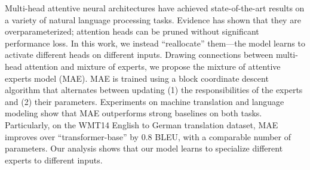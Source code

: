 Multi-head attentive neural architectures have achieved state-of-the-art results on a variety of natural language processing tasks. Evidence has shown that they are overparameterized; attention heads can be pruned without significant performance loss. In this work, we instead ``reallocate'' them—the model learns to activate different heads on different inputs. Drawing connections between multi-head attention and mixture of experts, we propose the mixture of attentive experts model (MAE). MAE is trained using a block coordinate descent algorithm that alternates between updating (1) the responsibilities of the experts and (2) their parameters. Experiments on machine translation and language modeling show that MAE outperforms strong baselines on both tasks. Particularly, on the WMT14 English to German translation dataset, MAE improves over ``transformer-base'' by 0.8 BLEU, with a comparable number of parameters. Our analysis shows that our model learns to specialize different experts to different inputs.
